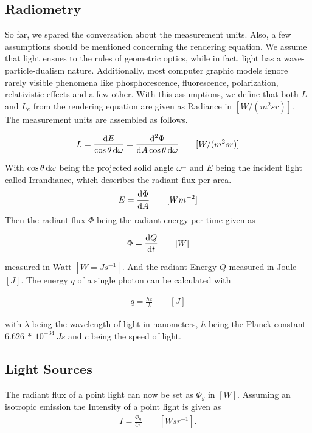 \subsection{Radiometry}


So far, we spared the conversation about the measurement units. Also, a few assumptions should be mentioned concerning the rendering equation. We assume that light ensues to the rules of geometric optics, while in fact, light has a wave-particle-dualism nature. Additionally, most computer graphic models ignore rarely visible phenomena like phosphorescence, fluorescence, polarization, relativistic effects and a few other. With this assumptions, we define that both $L$ and $L_e$ from the rendering equation are given as Radiance in $[W / (m^2sr)]$. The measurement units are assembled as follows.

\begin{align}
L = \frac{\mathop{}\!\mathrm{d} E}{\cos \theta \mathop{}\!\mathrm{d}\omega} = \frac{\mathop{}\!\mathrm{d}^2\Phi}{\mathop{}\!\mathrm{d} A\cos \theta \mathop{}\!\mathrm{d}\omega} \qquad [W / (m^2 sr) ]
\end{align}


With $\cos \theta \mathop{}\!\mathrm{d}\omega$ being the projected solid angle $\omega^\perp$ and $E$ being the incident light called Irrandiance, which describes the radiant flux per area.
\begin{align}
E = \frac{ \mathop{}\!\mathrm{d} \Phi }{ \mathop{}\!\mathrm{d} A } \qquad [W m^{-2} ]
\end{align}
Then the radiant flux $\Phi$ being the radiant energy per time given as

\begin{align}
 \Phi = \frac{\mathop{}\!\mathrm{d} Q}{\mathop{}\!\mathrm{d} t} \qquad [W]   
\end{align}

measured in Watt $[W = Js^{-1} ]$. And the radiant Energy $Q$ measured in Joule $[J]$. The energy $q$ of a single photon can be calculated with 

\begin{align}
 q = \frac{hc}{\lambda} \qquad [J]   
\end{align}

with $\lambda$ being the wavelength of light in nanometers, $h$ being the Planck constant $6.626~*~10^{-34}~Js$ and $c$ being the speed of light.

\subsection{Light Sources}


The radiant flux of a point light can now be set as $\Phi_g$ in $[W]$. Assuming an isotropic emission the Intensity of a point light is given as
\begin{align}
 I = \frac{\Phi_g}{4\pi} \qquad [ W sr^{-1} ] .
\end{align}

